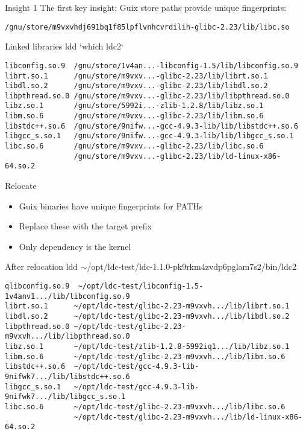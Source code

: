 \begin{frame}[fragile]{Insight 1}
  The first key insight: Guix store paths provide unique fingerprints:

\small
\begin{verbatim}
/gnu/store/m9vxvhdj691bq1f85lpflvnhcvrdilih-glibc-2.23/lib/libc.so
\end{verbatim}
\end{frame}

\begin{frame}[fragile]{Linked libraries}
  \small
ldd `which ldc2`
\begin{verbatim}
libconfig.so.9  /gnu/store/1v4an...-libconfig-1.5/lib/libconfig.so.9
librt.so.1      /gnu/store/m9vxv...-glibc-2.23/lib/librt.so.1
libdl.so.2      /gnu/store/m9vxv...-glibc-2.23/lib/libdl.so.2
libpthread.so.0 /gnu/store/m9vxv...-glibc-2.23/lib/libpthread.so.0
libz.so.1       /gnu/store/5992i...-zlib-1.2.8/lib/libz.so.1
libm.so.6       /gnu/store/m9vxv...-glibc-2.23/lib/libm.so.6
libstdc++.so.6  /gnu/store/9nifw...-gcc-4.9.3-lib/lib/libstdc++.so.6
libgcc_s.so.1   /gnu/store/9nifw...-gcc-4.9.3-lib/lib/libgcc_s.so.1
libc.so.6       /gnu/store/m9vxv...-glibc-2.23/lib/libc.so.6
                /gnu/store/m9vxv...-glibc-2.23/lib/ld-linux-x86-64.so.2
\end{verbatim}
\end{frame}

\begin{frame}{Relocate}
\begin{itemize}
\item Guix binaries have unique fingerprints for PATHs
\item Replace these with the target prefix
\item Only dependency is the kernel
\end{itemize}
\end{frame}


\begin{frame}[fragile]{After relocation}
  \small
  ldd $\sim$/opt/ldc-test/ldc-1.1.0-pk9rkm4zvdp6pglam7s2/bin/ldc2
\begin{verbatim}
qlibconfig.so.9  ~/opt/ldc-test/libconfig-1.5-1v4anv1.../lib/libconfig.so.9
librt.so.1      ~/opt/ldc-test/glibc-2.23-m9vxvh.../lib/librt.so.1
libdl.so.2      ~/opt/ldc-test/glibc-2.23-m9vxvh.../lib/libdl.so.2
libpthread.so.0 ~/opt/ldc-test/glibc-2.23-m9vxvh.../lib/libpthread.so.0
libz.so.1       ~/opt/ldc-test/zlib-1.2.8-5992iq1.../lib/libz.so.1
libm.so.6       ~/opt/ldc-test/glibc-2.23-m9vxvh.../lib/libm.so.6
libstdc++.so.6  ~/opt/ldc-test/gcc-4.9.3-lib-9nifwk7.../lib/libstdc++.so.6
libgcc_s.so.1   ~/opt/ldc-test/gcc-4.9.3-lib-9nifwk7.../lib/libgcc_s.so.1
libc.so.6       ~/opt/ldc-test/glibc-2.23-m9vxvh.../lib/libc.so.6
                ~/opt/ldc-test/glibc-2.23-m9vxvh.../lib/ld-linux-x86-64.so.2
\end{verbatim}
\end{frame}

